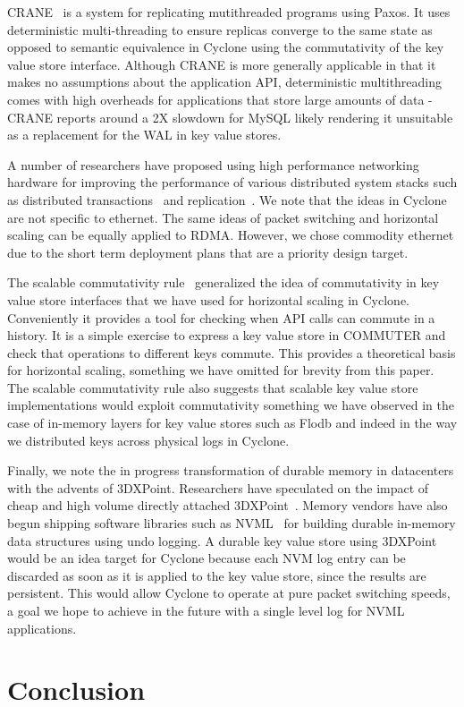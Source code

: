 \documentclass[10pt, preprint, nonatbib]{sigplanconf}
\begin{document}
{CRANE}~\cite{crane} is a system for replicating mutithreaded programs using
Paxos. It uses deterministic multi-threading to ensure replicas converge to the
same state as opposed to semantic equivalence in Cyclone using the commutativity
of the key value store interface. Although CRANE is more generally applicable in
that it makes no assumptions about the application API, deterministic
multithreading comes with high overheads for applications that store large
amounts of data - CRANE reports around a 2X slowdown for MySQL likely rendering
it unsuitable as a replacement for the WAL in key value stores.

A number of researchers have proposed using high performance networking hardware
for improving the performance of various distributed system stacks such as
distributed transactions~\cite{farm} and replication~\cite{dare, mojim}. We note
that the ideas in Cyclone are not specific to ethernet. The same ideas of packet
switching and horizontal scaling can be equally applied to RDMA. However, we
chose commodity ethernet due to the short term deployment plans that are a
priority design target. 

The scalable commutativity rule~\cite{scalable_commutativity} generalized the
idea of commutativity in key value store interfaces that we have used for
horizontal scaling in Cyclone. Conveniently it provides a tool for checking when
API calls can commute in a history. It is a simple exercise to express a key
value store in COMMUTER and check that operations to different keys
commute. This provides a theoretical basis for horizontal scaling, something we
have omitted for brevity from this paper. The scalable commutativity rule also
suggests that scalable key value store implementations would exploit
commutativity something we have observed in the case of in-memory layers for key
value stores such as Flodb and indeed in the way we distributed keys across
physical logs in Cyclone.

Finally, we note the in progress transformation of durable memory in datacenters
with the advents of 3DXPoint. Researchers have speculated on the impact of cheap
and high volume directly attached 3DXPoint~\cite{tiering}. Memory vendors have
also begun shipping software libraries such as NVML~\cite{nvml} for building durable
in-memory data structures using undo logging. A durable key value store using
3DXPoint would be an idea target for Cyclone because each NVM log entry can be
discarded as soon as it is applied to the key value store, since the results are
persistent. This would allow Cyclone to operate at pure packet switching speeds,
a goal we hope to achieve in the future with a single level log for NVML
applications.

\section{Conclusion}

\newcommand\myurl[2]{\url{#1}}


\end{document}
